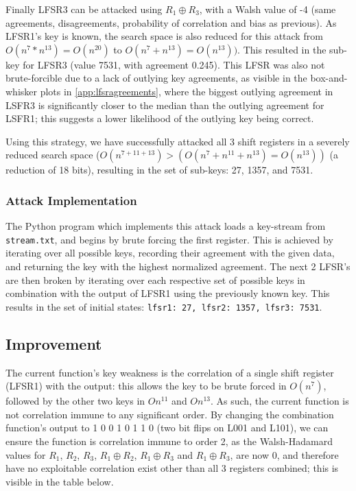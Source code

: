 \documentclass[british,11pt,a4paper]{article}
\begin{document}
Finally LFSR3 can be attacked using \(R_1 \oplus R_3\), with a Walsh value of -4 (same agreements, disagreements, probability of correlation and bias as previous).
As LFSR1's key is known, the search space is also reduced for this attack from \(O(n^{7} * n^{13})=O(n^{20})\) to \(O(n^7 + n^{13})=O(n^{13}))\). This resulted in the sub-key for LFSR3 (value 7531, with agreement 0.245). This LFSR was also not brute-forcible due to a lack of outlying key agreements, as visible in the box-and-whisker plots in \autoref{app:lfsragreements}, where the biggest outlying agreement in LSFR3 is significantly closer to the median than the outlying agreement for LSFR1; this suggests a lower likelihood of the outlying key being correct.

Using this strategy, we have successfully attacked all 3 shift registers in a severely reduced search space (\(O(n^{7+11+13})>(O(n^{7}+n^{11}+n^{13})=O(n^{13}))\) (a reduction of 18 bits), resulting in the set of sub-keys: 27, 1357, and 7531.

\subsubsection{Attack Implementation}
The Python program which implements this attack loads a key-stream from \lstinline{stream.txt}, and begins by brute forcing the first register.
This is achieved by iterating over all possible keys, recording their agreement with the given data, and returning the key with the highest normalized agreement.
The next 2 LFSR's are then broken by iterating over each respective set of possible keys in combination with the output of LFSR1 using the previously known key.
This results in the set of initial states: \lstinline{lfsr1: 27, lfsr2: 1357, lfsr3: 7531}.

\subsection{Improvement}
The current function's key weakness is the correlation of a single shift register (LFSR1) with the output: this allows the key to be brute forced in \(O(n^7)\), followed by the other two keys in \(On^{11}\) and \(On^{13}\).
As such, the current function is not correlation immune to any significant order.
By changing the combination function's output to 1 0 0 1 0 1 1 0 (two bit flips on L001 and L101), we can ensure the function
is correlation immune to order 2, as the Walsh-Hadamard values for \(R_1\),
\(R_2\),  \(R_3\),  \(R_1 \oplus R_2\), \(R_1 \oplus R_3\) and \(R_1 \oplus R_3\), are now 0,
and therefore have no exploitable correlation exist other than all 3 registers combined; this is visible in the table below.
\end{document}
